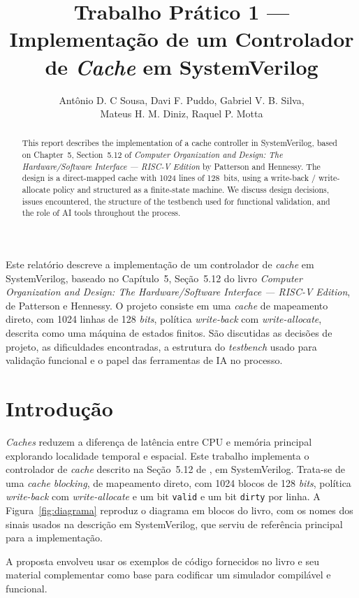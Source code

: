 \documentclass[12pt]{article}
\title{Trabalho Prático 1 --- Implementação de um Controlador de \emph{Cache}
em SystemVerilog}
\author{Antônio D. C Sousa, Davi F. Puddo, Gabriel V. B. Silva,\\ Mateus H. M. Diniz, Raquel P. Motta}
\begin{document}
\maketitle

\begin{resumo}
Este relatório descreve a implementação de um controlador de \emph{cache}
em SystemVerilog, baseado no Capítulo~5, Seção~5.12 do livro
\emph{Computer Organization and Design: The Hardware/Software Interface
--- RISC-V Edition}, de Patterson e Hennessy. O projeto consiste em uma
\emph{cache} de mapeamento direto, com 1024 linhas de 128 \emph{bits},
política \emph{write-back} com \emph{write-allocate}, descrita como uma
máquina de estados finitos. São discutidas as decisões de projeto, as
dificuldades encontradas, a estrutura do \emph{testbench} usado para validação
funcional e o papel das ferramentas de IA no processo.
\end{resumo}

\begin{abstract}
This report describes the implementation of a cache controller in
SystemVerilog, based on Chapter~5, Section~5.12 of \emph{Computer
Organization and Design: The Hardware/Software Interface --- RISC-V
Edition} by Patterson and Hennessy. The design is a direct-mapped cache
with 1024 lines of 128~bits, using a write-back / write-allocate policy
and structured as a finite-state machine. We discuss design decisions,
issues encountered,
the structure of the testbench used for functional validation, and the
role of AI tools throughout the process.
\end{abstract}

\section{Introdução}

\emph{Caches} reduzem a diferença de latência entre CPU e memória
principal explorando localidade temporal e espacial. Este trabalho
implementa o controlador de \emph{cache} descrito na Seção~5.12
de \cite{patterson:2021}, em SystemVerilog. Trata-se de uma
\emph{cache} \emph{blocking}, de mapeamento direto, com 1024 blocos
de 128 \emph{bits}, política \emph{write-back} com
\emph{write-allocate} e um bit \texttt{valid} e um bit
\texttt{dirty} por linha. A Figura~\ref{fig:diagrama} reproduz o
diagrama em blocos do livro, com os nomes dos sinais usados na
descrição em SystemVerilog, que serviu de referência principal para a implementação.

A proposta envolveu usar os exemplos de código fornecidos no livro e seu material complementar como base para codificar um simulador compilável e funcional. 
\end{document}
